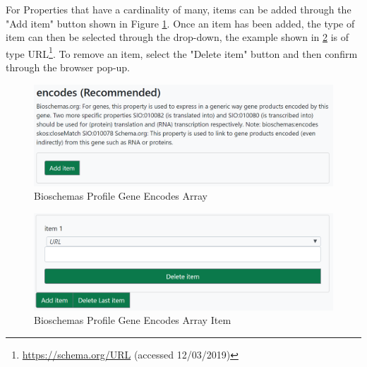 For Properties that have a cardinality of many, items can be added through the "Add item" button shown in Figure \ref{fig:arrayAdd}. Once an item has been added, the type of item can then be selected through the drop-down, the example shown in \ref{fig:arrayDelete} is of type URL\footnote{\url{https://schema.org/URL} (accessed 12/03/2019)}. To remove an item, select the "Delete item" button and then confirm through the browser pop-up.

\begin{figure}[!h]
 \centering\includegraphics[scale=0.8]{images/system/geneAdd.PNG}
   \caption{Bioschemas Profile Gene Encodes Array}
   \label{fig:arrayAdd}
\end{figure}

\begin{figure}[!h]
 \centering\includegraphics[scale=0.8]{images/system/geneRemove.PNG}
   \caption{Bioschemas Profile Gene Encodes Array Item}
   \label{fig:arrayDelete}
\end{figure}

